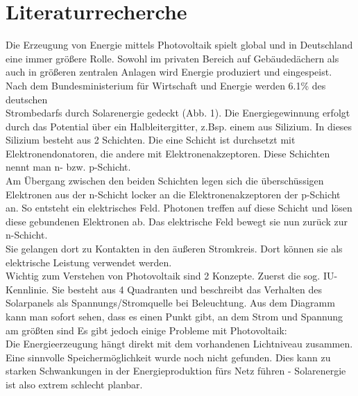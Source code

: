 \section{Literaturrecherche}

Die Erzeugung von Energie mittels Photovoltaik spielt global und in Deutschland eine immer größere Rolle. \n
Sowohl im privaten Bereich auf Gebäudedächern als auch in größeren zentralen Anlagen wird Energie produziert
und eingespeist.\\
Nach dem Bundesministerium  für Wirtschaft und Energie werden 6.1\% des deutschen\\ Strombedarfs durch Solarenergie gedeckt (Abb. 1).
Die Energiegewinnung erfolgt durch das Potential über ein Halbleitergitter, z.Bsp. einem aus Silizium.
In dieses Silizium besteht aus 2 Schichten. Die eine Schicht ist durchsetzt mit Elektronendonatoren, die andere mit Elektronenakzeptoren. Diese Schichten nennt man n- bzw. p-Schicht.\\ Am Übergang zwischen den beiden Schichten legen sich die überschüssigen Elektronen aus der n-Schicht locker an die Elektronenakzeptoren der p-Schicht an. So entsteht ein elektrisches Feld. Photonen treffen auf diese Schicht und lösen diese gebundenen Elektronen ab. Das elektrische Feld bewegt sie nun zurück zur n-Schicht.\\ Sie gelangen dort zu Kontakten in den äußeren Stromkreis. Dort können sie als elektrische Leistung verwendet werden. \cite{WdP}\\
Wichtig zum Verstehen von Photovoltaik sind 2 Konzepte. Zuerst die sog. IU-Kennlinie. Sie besteht aus 4 Quadranten und beschreibt das Verhalten des Solarpanels als Spannungs/Stromquelle bei Beleuchtung. Aus dem Diagramm kann man sofort sehen, dass es einen Punkt gibt, an dem Strom und Spannung am größten sind
Es gibt jedoch einige Probleme mit Photovoltaik:\\
Die Energieerzeugung hängt direkt mit dem vorhandenen Lichtniveau zusammen.
Eine sinnvolle Speichermöglichkeit wurde noch nicht gefunden. Dies kann zu starken Schwankungen in der Energieproduktion fürs Netz führen - Solarenergie ist also extrem schlecht planbar.
